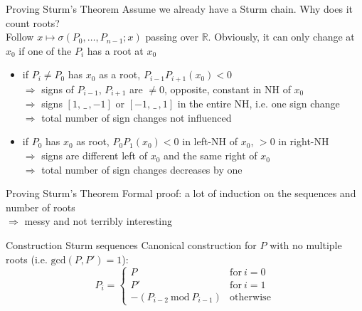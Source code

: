 \documentclass[%
	sans,			%
	mathsans,		%
	10pt,
	t		%
	slidescentered,%
]{beamer}
\newcommand{\RR}{\mathbb{R}}
\begin{document}
\begin{frame}{Proving Sturm's Theorem}
Assume we already have a Sturm chain. Why does it count roots?\\
Follow $x \mapsto \sigma(P_0, \ldots, P_{n-1}; x)$ passing over $\RR$. Obviously, it can only change at $x_0$ if one of the $P_i$ has a root at $x_0$
\begin{itemize}
\item if $P_i \neq P_0$ has $x_0$ as a root, $P_{i-1}P_{i+1}(x_0) < 0$\\
$\Rightarrow$ signs of $P_{i-1}$, $P_{i+1}$ are $\neq 0$, opposite, constant in NH of $x_0$\\
$\Rightarrow$ signs $[1,\, \_\,, -1]$ or $[-1,\, \_\,, 1]$ in the entire NH, i.e. one sign change\\
$\Rightarrow$ total number of sign changes not influenced\\[1mm]
\item if $P_0$ has $x_0$ as root, $P_0P_1(x_0) < 0$ in left-NH of $x_0$, $>0$ in right-NH\\
$\Rightarrow$ signs are different left of $x_0$ and the same right of $x_0$\\
$\Rightarrow$ total number of sign changes decreases by one
\end{itemize}
\end{frame}

\begin{frame}{Proving Sturm's Theorem}
Formal proof: a lot of induction on the sequences and number of roots\\[2mm]
$\Longrightarrow$ messy and not terribly interesting
\end{frame}

\begin{frame}{Construction Sturm sequences}
Canonical construction for $P$ with no multiple roots (i.e. $\mathrm{gcd}(P,P') = 1$):
$$P_i = \begin{cases}
P & \mathrm{for}\ i = 0\\
P' & \mathrm{for}\ i = 1\\
-(P_{i-2}\ \mathrm{mod}\ P_{i-1}) & \mathrm{otherwise}
\end{cases}$$
\end{frame}
\end{document}
